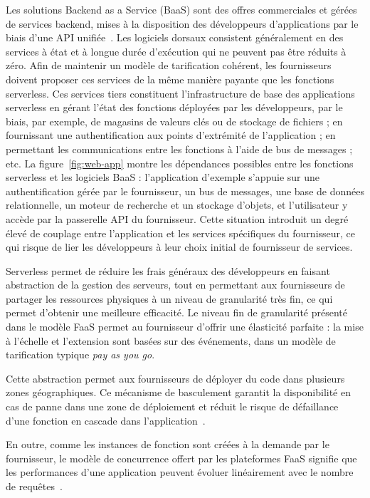 Les solutions Backend as a Service (BaaS) sont des offres commerciales et gérées de services backend, mises à la disposition des développeurs d'applications par le biais d'une API unifiée~\cite{mikeroberts2018serverless}. Les logiciels dorsaux consistent généralement en des services à état et à longue durée d'exécution qui ne peuvent pas être réduits à zéro. Afin de maintenir un modèle de tarification cohérent, les fournisseurs doivent proposer ces services de la même manière payante que les fonctions serverless. Ces services tiers constituent l'infrastructure de base des applications serverless en gérant l'état des fonctions déployées par les développeurs, par le biais, par exemple, de magasins de valeurs clés ou de stockage de fichiers ; en fournissant une authentification aux points d'extrémité de l'application ; en permettant les communications entre les fonctions à l'aide de bus de messages ; etc. La figure~\ref{fig:web-app} montre les dépendances possibles entre les fonctions serverless et les logiciels BaaS : l'application d'exemple s'appuie sur une authentification gérée par le fournisseur, un bus de messages, une base de données relationnelle, un moteur de recherche et un stockage d'objets, et l'utilisateur y accède par la passerelle API du fournisseur. Cette situation introduit un degré élevé de couplage entre l'application et les services spécifiques du fournisseur, ce qui risque de lier les développeurs à leur choix initial de fournisseur de services.

Serverless permet de réduire les frais généraux des développeurs en faisant abstraction de la gestion des serveurs, tout en permettant aux fournisseurs de partager les ressources physiques à un niveau de granularité très fin, ce qui permet d'obtenir une meilleure efficacité. Le niveau fin de granularité présenté dans le modèle FaaS permet au fournisseur d'offrir une élasticité parfaite : la mise à l'échelle et l'extension sont basées sur des événements, dans un modèle de tarification typique \textit{pay as you go}.

Cette abstraction permet aux fournisseurs de déployer du code dans plusieurs zones géographiques. Ce mécanisme de basculement garantit la disponibilité en cas de panne dans une zone de déploiement et réduit le risque de défaillance d'une fonction en cascade dans l'application~\cite{taibiPatternsServerlessFunctions2020}.

En outre, comme les instances de fonction sont créées à la demande par le fournisseur, le modèle de concurrence offert par les plateformes FaaS signifie que les performances d'une application peuvent évoluer linéairement avec le nombre de requêtes~\cite{mcgrathServerlessComputingDesign2017}.

